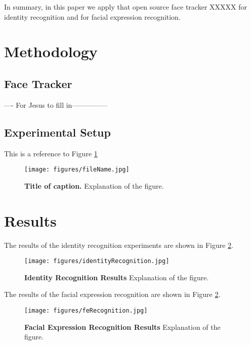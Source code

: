\documentclass[]{article}
\begin{document}
In summary, in this paper we apply that open source face tracker XXXXX for identity recognition and for facial
expression recognition.



\section{Methodology}
\subsection{Face Tracker}
---- For Jesus to fill in---------------

\subsection{Experimental Setup}
This is a reference to Figure \ref{figureLabel}

\begin{figure}[ht]
\begin{center}
\vspace{-3mm}
\texttt{[image: figures/fileName.jpg]}
\end{center}
\caption{\textbf{Title of caption.} Explanation of the figure.}
\label{figureLabel}
\end{figure}


\section{Results}
The results of the identity recognition experiments are shown in Figure \ref{}.


\begin{figure}[ht]
\begin{center}
\vspace{-3mm}
\texttt{[image: figures/identityRecognition.jpg]}
\end{center}
\caption{\textbf{Identity Recognition Results} Explanation of the figure.}
\label{identityRecognition}
\end{figure}


The results of the facial expression recognition  are shown in Figure \ref{}.

\begin{figure}[ht]
\begin{center}
\vspace{-3mm}
\texttt{[image: figures/feRecognition.jpg]}
\end{center}
\caption{\textbf{Facial Expression Recognition Results} Explanation of the figure.}
\label{feRecognition}
\end{figure}
\end{document}
